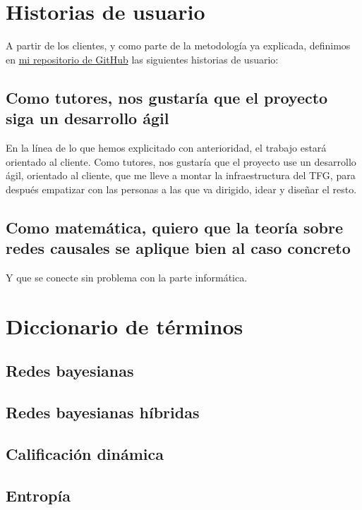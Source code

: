 \section{Historias de usuario}  

A partir de los clientes, y como parte de la metodología ya explicada, definimos en \href{https://github.com/ElenaMerelo/TFG}{mi repositorio 
de GitHub} las siguientes historias de usuario: 

\subsection{Como tutores, nos gustaría que el proyecto siga un desarrollo ágil}

En la línea de lo que hemos explicitado con anterioridad, el trabajo estará orientado 
al cliente.
Como tutores, nos gustaría que el proyecto use un desarrollo ágil, orientado al cliente, 
que me lleve a montar la infraestructura del TFG, para después empatizar con las personas 
a las que va dirigido, idear y diseñar el resto.

\subsection*{Como matemática, quiero que la teoría sobre redes causales se aplique bien al caso concreto}

Y que se conecte sin problema con la parte informática.


\section{Diccionario de términos}
\subsection{Redes bayesianas}

\subsection{Redes bayesianas híbridas}

\subsection{Calificación dinámica}

\subsection{Entropía}

